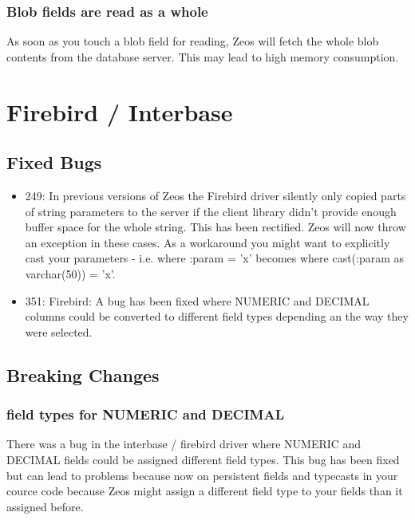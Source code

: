 \documentclass[a4paper,12pt,oneside]{book}
\begin{document}
\subsubsection{Blob fields are read as a whole}
\label{sec:Rev6_General_KnownProblems_BlobFields}

As soon as you touch a blob field for reading, Zeos will fetch the whole blob contents from the database server.
This may lead to high memory consumption.

\section{Firebird / Interbase}
\label{sec:Rev6_FirebirdInterbase}

\subsection{Fixed Bugs}
\label{sec:Rev6_FirebirdInterbase_FixedBugs}

\begin{itemize}
\item 
  249: In previous versions of Zeos the Firebird driver silently only copied parts of string parameters to the server if the client library didn't provide enough buffer space for the whole string.
	This has been rectified.
	Zeos will now throw an exception in these cases.
	As a workaround you might want to explicitly cast your parameters - i.e. where :param = 'x' becomes where cast(:param as varchar(50)) = 'x'.
\item
  351: Firebird: A bug has been fixed where NUMERIC and DECIMAL columns could be converted to different field types depending an the way they were selected.
\end{itemize}

\subsection{Breaking Changes}
\label{sec:Rev6_FirebirdInterbase_BreakingChanges}

\subsubsection{field types for NUMERIC and DECIMAL}
\label{sec:Rev6_FirebirdInterbase_BreakingChanges_FieldTypesNumericDecimal}

There was a bug in the interbase / firebird driver where NUMERIC and DECIMAL fields could be assigned different field types.
This bug has been fixed but can lead to problems because now on persistent fields and typecasts in your cource code because Zeos might assign a different field type to your fields than it assigned before.
\end{document}
